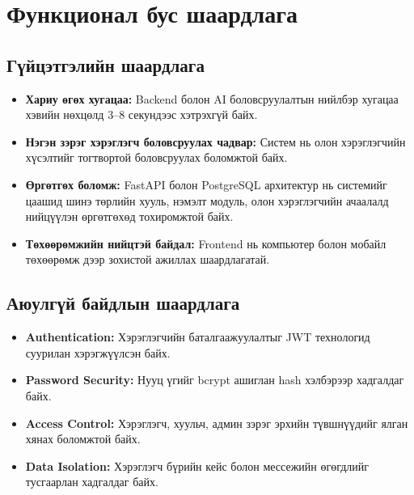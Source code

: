 
\section{Функционал бус шаардлага}

\subsection{Гүйцэтгэлийн шаардлага}

\begin{itemize}
    \item \textbf{Хариу өгөх хугацаа:} Backend болон AI боловсруулалтын нийлбэр хугацаа хэвийн нөхцөлд 3--8 секундээс хэтрэхгүй байх.

    \item \textbf{Нэгэн зэрэг хэрэглэгч боловсруулах чадвар:} Систем нь олон хэрэглэгчийн хүсэлтийг тогтвортой боловсруулах боломжтой байх.

    \item \textbf{Өргөтгөх боломж:} FastAPI болон PostgreSQL архитектур нь системийг цаашид шинэ төрлийн хууль, нэмэлт модуль, олон хэрэглэгчийн ачаалалд нийцүүлэн өргөтгөхөд тохиромжтой байх.

    \item \textbf{Төхөөрөмжийн нийцтэй байдал:} Frontend нь компьютер болон мобайл төхөөрөмж дээр зохистой ажиллах шаардлагатай.
\end{itemize}

\subsection{Аюулгүй байдлын шаардлага}

\begin{itemize}
    \item \textbf{Authentication:} Хэрэглэгчийн баталгаажуулалтыг JWT технологид суурилан хэрэгжүүлсэн байх.

    \item \textbf{Password Security:} Нууц үгийг bcrypt ашиглан hash хэлбэрээр хадгалдаг байх.

    \item \textbf{Access Control:} Хэрэглэгч, хуульч, админ зэрэг эрхийн түвшнүүдийг ялган хянах боломжтой байх.

    \item \textbf{Data Isolation:} Хэрэглэгч бүрийн кейс болон мессежийн өгөгдлийг тусгаарлан хадгалдаг байх.
\end{itemize}

